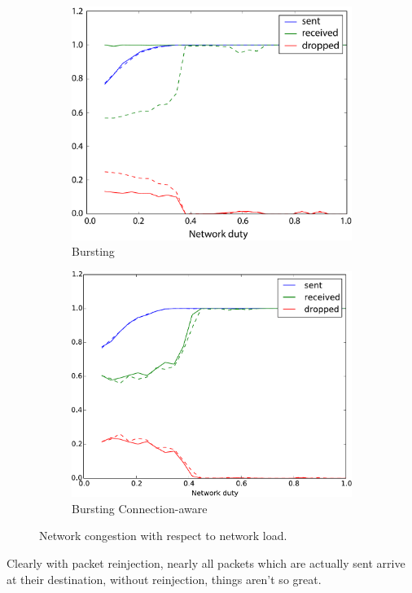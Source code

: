 \documentclass[a4paper, 11pt]{article}
\begin{document}
\begin{figure}
	\begin{subfigure}[htbp]{.5\linewidth}
		\centering
		\includegraphics[width=0.9\linewidth]{images/bursting.pdf}
		\caption{Bursting}
		\label{fig:bursting}
	\end{subfigure}
	\begin{subfigure}[htbp]{.5\linewidth}
		\centering
		\includegraphics[width=0.9\linewidth]{images/bursting_connaware2.pdf}
		\caption{Bursting Connection-aware}	
		\label{fig:bursting_aware}
	\end{subfigure}
	\caption{Network congestion with respect to network load.}
\end{figure}


Clearly with packet reinjection, nearly all packets which are actually sent arrive at their destination, without reinjection, things aren't so great.
\end{document}
